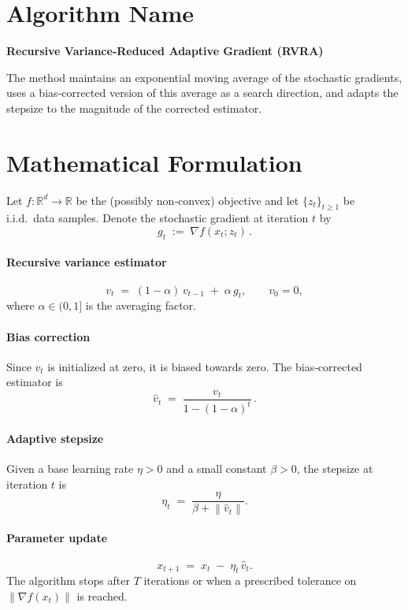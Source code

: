 \documentclass{article}
\newcommand{\norm}[1]{\left\|#1\right\|}
\newcommand{\grad}{\nabla}
\begin{document}
\section*{Algorithm Name}
\textbf{Recursive Variance‑Reduced Adaptive Gradient (RVRA)}  

The method maintains an exponential moving average of the stochastic gradients,
uses a bias‑corrected version of this average as a search direction,
and adapts the stepsize to the magnitude of the corrected estimator.

\section*{Mathematical Formulation}
Let $f:\mathbb{R}^d\!\to\!\mathbb{R}$ be the (possibly non‑convex) objective and let
$\{z_t\}_{t\ge 1}$ be i.i.d.\ data samples.  
Denote the stochastic gradient at iteration $t$ by
\[
g_t \;:=\; \grad f(x_t;z_t)\, .
\]

\paragraph{Recursive variance estimator}
\begin{equation}
\label{eq:vt}
v_t \;=\;(1-\alpha)\,v_{t-1}\;+\;\alpha\, g_t ,\qquad v_0 = 0,
\end{equation}
where $\alpha\in(0,1]$ is the averaging factor.

\paragraph{Bias correction}
Since $v_t$ is initialized at zero, it is biased towards zero.
The bias‑corrected estimator is
\begin{equation}
\label{eq:vh}
\hat v_t \;=\;\frac{v_t}{1-(1-\alpha)^t}\, .
\end{equation}

\paragraph{Adaptive stepsize}
Given a base learning rate $\eta>0$ and a small constant $\beta>0$,
the stepsize at iteration $t$ is
\begin{equation}
\label{eq:etat}
\eta_t \;=\;\frac{\eta}{\beta + \norm{\hat v_t}} .
\end{equation}

\paragraph{Parameter update}
\begin{equation}
\label{eq:update}
x_{t+1}\;=\;x_t \;-\; \eta_t \,\hat v_t .
\end{equation}
The algorithm stops after $T$ iterations or when a prescribed tolerance on
$\norm{\grad f(x_t)}$ is reached.
\end{document}
